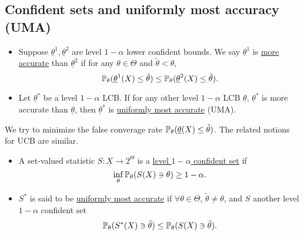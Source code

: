 \subsection{Confident sets and uniformly most accuracy (UMA)}
\begin{mydef}\textbf{ }
	\begin{itemize}
		\item Suppose $\underline{\theta}^1,\underline{\theta}^2$ are level $1-\alpha$ lower confident bounds. We say $\underline{\theta}^1$ is \uline{more accurate} than $\underline{\theta}^2$ if for any $\theta \in \Theta$ and $\tilde{\theta}<\theta$,
		$$\mathbb{P}_\theta( \underline{\theta}^1(X) \leq \tilde{\theta} ) \leq \mathbb{P}_\theta( \underline{\theta}^2(X) \leq \tilde{\theta} ).$$
		
		\item
		Let $\underline{\theta}^\ast$ be a level $1-\alpha$ LCB. If for any other level $1-\alpha$ LCB $\underline{\theta}$, $\underline{\theta}^\ast$ is more accurate than $\underline{\theta}$, then $\underline{\theta}^\ast$ is \uline{uniformly most accurate} (UMA). 
	\end{itemize}
\end{mydef}
\begin{remark}
	We try to minimize the false converage rate $\mathbb{P}_\theta( \underline{\theta}(X)\leq \tilde{\theta} )$. The related notions for UCB are similar.
\end{remark}


\begin{mydef}\textbf{ }
	\begin{itemize}
		\item 
		A set-valued statistic $S: \underline{X} \to 2^\Theta$ is a \uline{level $1-\alpha$ confident set} if
		$$ \inf_\theta \mathbb{P}_\theta( S(X) \ni \theta ) \geq 1- \alpha.$$
		
		\item
		$S^\ast$ is said to be \uline{uniformly most accurate} if $\forall \theta \in \Theta$, $\tilde{\theta}\neq \theta$, and $S$ another level $1-\alpha$ confident set
		$$\mathbb{P}_\theta (  S^\ast(X) \ni \tilde{\theta}  ) \leq \mathbb{P}_\theta(  S(X) \ni \tilde{\theta}  ).$$
	\end{itemize}
\end{mydef}
\begin{comment}
\begin{exap}[No UMA confident interval]
...
\end{exap}
	content...
\end{comment}

